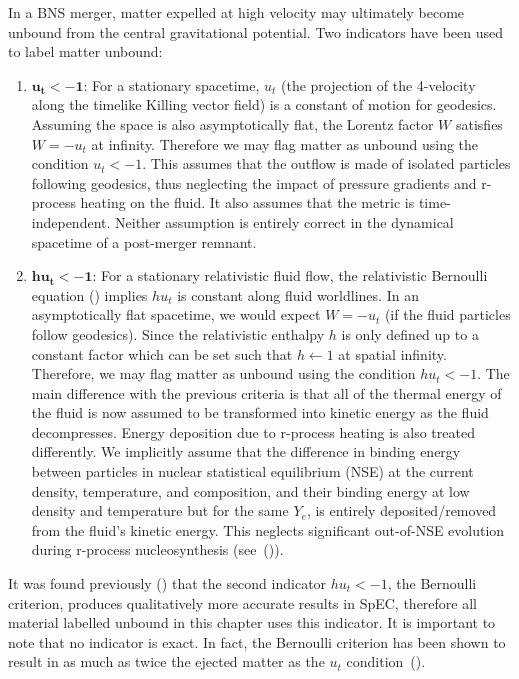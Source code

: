 In a BNS merger, matter expelled at high velocity may
ultimately become unbound from the central gravitational potential. Two indicators have been used to label matter unbound:
%
\begin{enumerate}
\item{$\mathbf{u_t < -1}$: For a stationary spacetime, $u_t$ (the projection of the 4-velocity along the timelike Killing vector field) is a constant of motion for geodesics. Assuming the space is also asymptotically flat, the Lorentz factor $W$ satisfies $W = -u_t$ at infinity. Therefore we may flag matter as unbound using the condition  $u_t < -1$. This assumes that the outflow is made of isolated particles following geodesics, thus neglecting the impact of pressure gradients and r-process heating on the fluid. It also assumes that the metric is time-independent. Neither assumption is entirely correct in the dynamical spacetime of a post-merger remnant.} \\
\item{$\mathbf{hu_t < -1}$: For a stationary relativistic fluid flow, the relativistic Bernoulli equation (\citet*{rezzolla2013relativistic}) implies $hu_t$ is constant along fluid worldlines. In an asymptotically flat spacetime, we would expect $W = -u_t$ (if the fluid particles follow geodesics). Since the relativistic enthalpy $h$ is only defined up to a constant factor which can be set such that $h \leftarrow 1$ at spatial infinity. Therefore, we may flag matter as unbound using the condition $hu_t < -1$. The main difference with the previous criteria is that all of the thermal energy of the fluid is now assumed to be transformed into kinetic energy as the fluid decompresses. Energy deposition due to r-process heating is also treated differently. We implicitly assume that the difference in binding energy between particles in nuclear statistical equilibrium (NSE) at the current density, temperature, and composition, and their binding energy at low density and temperature but for the same $Y_e$, is entirely deposited/removed from the fluid's kinetic energy. This neglects significant out-of-NSE evolution during r-process nucleosynthesis (see~(\citet*{foucartbhns2016}))}.
\end{enumerate}

It was found previously (\citet*{foucart:2015gaa}) that the second indicator $hu_t < -1$, the Bernoulli criterion, produces
qualitatively more accurate results in SpEC, therefore all material labelled unbound in this chapter uses this indicator. It is important to note that no indicator is exact.  In fact, the Bernoulli criterion has been shown to result in as much as twice the ejected matter as the $u_t$ condition~(\citet*{kastaun:2014fna}). 

